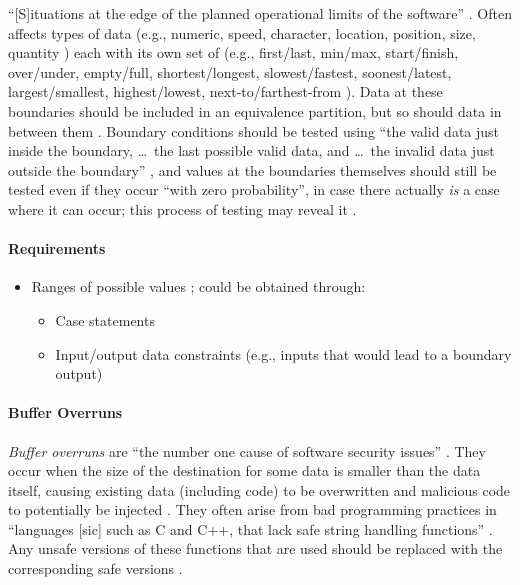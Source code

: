 ``[S]ituations at the edge of the planned operational limits of the software''
\citep[p.~72]{Patton2006}. Often affects types of data (e.g., numeric,
speed, character, location, position, size, quantity
\citep[p.~72]{Patton2006}) each with its own set of (e.g., first/last,
min/max, start/finish, over/under, empty/full, shortest/longest,
slowest/fastest, soonest/latest, largest/smallest, highest/lowest,
next-to/farthest-from \citep[pp.~72-73]{Patton2006}). Data at these
boundaries should be included in an equivalence partition, but so should
data in between them \citep[p.~73]{Patton2006}. Boundary conditions
should be tested using ``the valid data just inside the boundary,
\dots\ the last possible valid data, and \dots\ the invalid data just outside the
boundary'' \citep[p.~73]{Patton2006}, and values at the boundaries
themselves should still be tested even if they occur ``with zero probability'',
in case there actually \emph{is} a case where it can occur; this process of
testing may reveal it \citep[p.~460]{PetersAndPedrycz2000}.

\paragraph{Requirements}
\begin{itemize}
      \item Ranges of possible values \citep[p.~67,~73]{Patton2006};
            could be obtained through:
            \begin{itemize}
                  \item Case statements
                  \item Input/output data constraints (e.g., inputs that
                        would lead to a boundary output)
            \end{itemize}
\end{itemize}

\paragraph{Buffer Overruns \citep[pp.~201-205]{Patton2006}}

\emph{Buffer overruns} are ``the number one cause of software security issues''
\citep[p.~75]{Patton2006}. They occur when the size of the destination
for some data is smaller than the data itself, causing existing data (including
code) to be overwritten and malicious code to potentially be injected
\citep[p.~202,~204-205]{Patton2006}. They often arise from bad
programming practices in ``languages [sic] such as C and C++, that lack safe
string handling functions'' \citep[p.~201]{Patton2006}. Any unsafe
versions of these functions that are used should be replaced with the
corresponding safe versions \citep[pp.~203-204]{Patton2006}.

